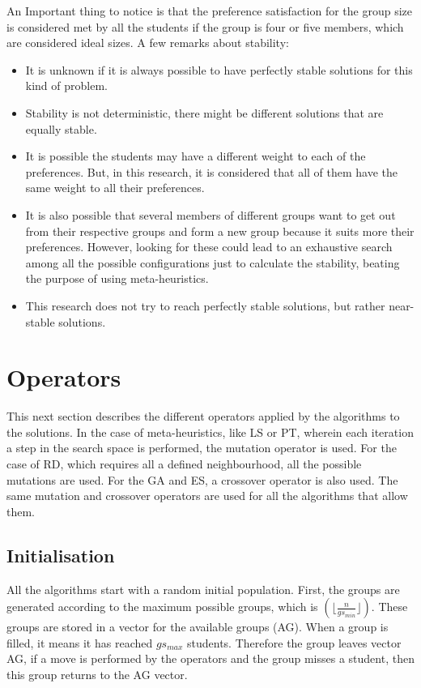 An Important thing to notice is that the preference satisfaction for the group size is considered met by all the students if the group is four or five members, which are considered ideal sizes. A few remarks about stability:

\begin{itemize}
    \item It is unknown if it is always possible to have perfectly stable solutions for this kind of problem.
    \item Stability is not deterministic, there might be different solutions that are equally stable.
    \item It is possible the students may have a different weight to each of the preferences. But, in this research, it is considered that all of them have the same weight to all their preferences.
    \item It is also possible that several members of different groups want to get out from their respective groups and form a new group because it suits more their preferences. However, looking for these could lead to an exhaustive search among all the possible configurations just to calculate the stability, beating the purpose of using meta-heuristics.
    \item This research does not try to reach perfectly stable solutions, but rather near-stable solutions. 
\end{itemize}

\section{Operators} 
\label{sec:operators}

This next section describes the different operators applied by the algorithms to the solutions. In the case of meta-heuristics, like LS or PT, wherein each iteration a step in the search space is performed, the mutation operator is used. For the case of RD, which requires all a defined neighbourhood, all the possible mutations are used. For the GA and ES, a crossover operator is also used. The same mutation and crossover operators are used for all the algorithms that allow them.\\

\subsection{Initialisation}
\label{sec:initialisation}

All the algorithms start with a random initial population. First, the groups are generated according to the maximum possible groups, which is $(\lfloor\frac{n}{gs_{min}}\rfloor)$. These groups are stored in a vector for the available groups (AG). When a group is filled, it means it has reached $gs_{max}$ students. Therefore the group leaves vector AG, if a move is performed by the operators and the group misses a student, then this group returns to the AG vector.\\

